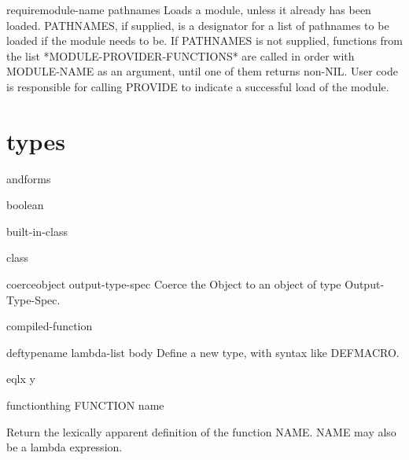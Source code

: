 \begin{function}{require}{module-name \op pathnames}{}
  Loads a module, unless it already has been loaded. PATHNAMES, if supplied,
   is a designator for a list of pathnames to be loaded if the module
   needs to be. If PATHNAMES is not supplied, functions from the list
   *MODULE-PROVIDER-FUNCTIONS* are called in order with MODULE-NAME
   as an argument, until one of them returns non-NIL.  User code is
   responsible for calling PROVIDE to indicate a successful load of the
   module.
\end{function}

\section{types}

\begin{type-specifier}{and}{\rest forms}{}
  
\end{type-specifier}

\begin{type}{boolean}{}{}
  
\end{type}

\begin{class}{built-in-class}{}{}
  
\end{class}

\begin{class}{class}{}{}
  
\end{class}

\begin{function}{coerce}{object output-type-spec}{}
  Coerce the Object to an object of type Output-Type-Spec.
\end{function}

\begin{type}{compiled-function}{}{}
  
\end{type}

\begin{macro}{deftype}{name lambda-list \body body}{}
  Define a new type, with syntax like DEFMACRO.
\end{macro}

\begin{type-specifier}{eql}{x y}{}
  
\end{type-specifier}

\begin{class}{function}{thing}{}
  FUNCTION name

Return the lexically apparent definition of the function NAME. NAME may also
be a lambda expression.
\end{class}

